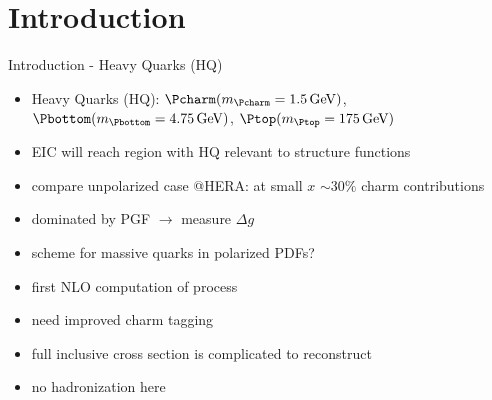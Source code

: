 \section{Introduction}

\begin{frame}{Introduction - Heavy Quarks (HQ)}
\begin{itemize}
\item Heavy Quarks (HQ): $\Pcharm (m_{\Pcharm}=\SI{1.5}{\GeV})$, $\Pbottom (m_{\Pbottom}=\SI{4.75}{\GeV})$, $\Ptop (m_{\Ptop}=\SI{175}{\GeV})$
\item EIC will reach region with HQ relevant to structure functions
\item compare unpolarized case @HERA: at small $x$ $\sim 30\%$ charm contributions
\item dominated by PGF $\to$ measure $\Delta g$
\item scheme for massive quarks in polarized PDFs?
\item first NLO computation of process
\end{itemize}
\begin{itemize}
\item need improved charm tagging
\item full inclusive cross section is complicated to reconstruct
\item no hadronization here

\end{itemize}
\end{frame}

